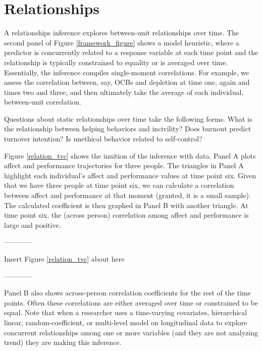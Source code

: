\documentclass[english,,man]{apa6}
\begin{document}
\hypertarget{relationships}{%
\section{Relationships}\label{relationships}}

A relationships inference explores between-unit relationships over time. The second panel of Figure \ref{framework_figure} shows a model heuristic, where a predictor is concurrently related to a response variable at each time point and the relationship is typically constrained to equality or is averaged over time. Essentially, the inference compiles single-moment correlations. For example, we assess the correlation between, say, OCBs and depletion at time one, again and times two and three, and then ultimately take the average of each individual, between-unit correlation.

Questions about static relationships over time take the following forms. What is the relationship between helping behaviors and incivility? Does burnout predict turnover intention? Is unethical behavior related to self-control?

Figure \ref{relation_tvc} shows the inuition of the inference with data. Panel A plots affect and performance trajectories for three people. The triangles in Panel A highlight each individual's affect and performance values at time point six. Given that we have three people at time point six, we can calculate a correlation between affect and performance at that moment (granted, it is a small sample). The calculated coefficient is then graphed in Panel B with another triangle. At time point six, the (across person) correlation among affect and performance is large and positive.

\begin{center}

------------

Insert Figure \ref{relation_tvc} about here

------------

\end{center}

Panel B also shows across-person correlation coefficients for the rest of the time points. Often these correlations are either averaged over time or constrained to be equal. Note that when a researcher uses a time-varying covariates, hierarchical linear, random-coefficient, or multi-level model on longitudinal data to explore concurrent relationships among one or more variables (and they are not analyzing trend) they are making this inference.
\end{document}
